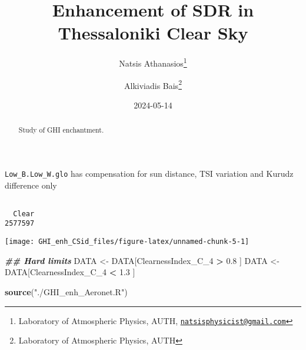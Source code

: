 \documentclass[
  10pt,
  a4paper,oneside]{article}
\title{Enhancement of SDR in Thessaloniki Clear Sky}
\author{Natsis Athanasios\footnote{Laboratory of Atmospheric Physics, AUTH, \href{mailto:natsisphysicist@gmail.com}{\nolinkurl{natsisphysicist@gmail.com}}} \and Alkiviadis Bais\footnote{Laboratory of Atmospheric Physics, AUTH}}
\date{2024-05-14}
\newenvironment{Shaded}{\begin{snugshade}}{\end{snugshade}}
\newcommand{\DocumentationTok}[1]{\textcolor[rgb]{0.56,0.35,0.01}{\textbf{\textit{#1}}}}
\newcommand{\FloatTok}[1]{\textcolor[rgb]{0.00,0.00,0.81}{#1}}
\newcommand{\FunctionTok}[1]{\textcolor[rgb]{0.13,0.29,0.53}{\textbf{#1}}}
\newcommand{\NormalTok}[1]{#1}
\newcommand{\OtherTok}[1]{\textcolor[rgb]{0.56,0.35,0.01}{#1}}
\newcommand{\SpecialCharTok}[1]{\textcolor[rgb]{0.81,0.36,0.00}{\textbf{#1}}}
\newcommand{\StringTok}[1]{\textcolor[rgb]{0.31,0.60,0.02}{#1}}
\begin{document}
\maketitle
\begin{abstract}
Study of GHI enchantment.
\end{abstract}

{
\hypersetup{linkcolor=}
\setcounter{tocdepth}{4}
\tableofcontents
}
\texttt{Low\_B.Low\_W.glo} has compensation for sun distance, TSI variation and Kurudz difference only

\begin{Shaded}
\end{Shaded}

\begin{verbatim}

  Clear 
2577597 
\end{verbatim}

\begin{Shaded}
\end{Shaded}

\begin{center}\texttt{[image: GHI\_enh\_CSid\_files/figure-latex/unnamed-chunk-5-1]} \end{center}

\begin{Shaded}
\begin{Highlighting}[]
\DocumentationTok{\#\# Hard limits}
\NormalTok{DATA }\OtherTok{\textless{}{-}}\NormalTok{ DATA[ClearnessIndex\_C\_4 }\SpecialCharTok{\textgreater{}} \FloatTok{0.8}\NormalTok{ ]}
\NormalTok{DATA }\OtherTok{\textless{}{-}}\NormalTok{ DATA[ClearnessIndex\_C\_4 }\SpecialCharTok{\textless{}} \FloatTok{1.3}\NormalTok{ ]}

\FunctionTok{source}\NormalTok{(}\StringTok{"./GHI\_enh\_Aeronet.R"}\NormalTok{)}
\end{Highlighting}
\end{Shaded}
\end{document}
